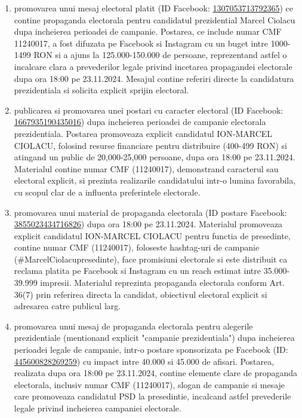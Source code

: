 \documentclass[a4paper,12pt]{article}
\begin{document}
\begin{enumerate}[leftmargin=*, label=\arabic*.)]
    \item promovarea unui mesaj electoral platit (ID Facebook: \href{https://www.facebook.com/ads/library/?id=1307053713792365}{1307053713792365}) ce contine propaganda electorala pentru candidatul prezidential Marcel Ciolacu dupa incheierea perioadei de campanie. Postarea, ce include numar CMF 11240017, a fost difuzata pe Facebook si Instagram cu un buget intre 1000-1499 RON si a ajuns la 125.000-150.000 de persoane, reprezentand astfel o incalcare clara a prevederilor legale privind incetarea propagandei electorale dupa ora 18:00 pe 23.11.2024. Mesajul contine referiri directe la candidatura prezidentiala si solicita explicit sprijin electoral.
    \item publicarea si promovarea unei postari cu caracter electoral (ID Facebook: \href{https://www.facebook.com/ads/library/?id=1667935190435016}{1667935190435016}) dupa incheierea perioadei de campanie electorala prezidentiala. Postarea promoveaza explicit candidatul ION-MARCEL CIOLACU, folosind resurse financiare pentru distribuire (400-499 RON) si atingand un public de 20,000-25,000 persoane, dupa ora 18:00 pe 23.11.2024. Materialul contine numar CMF (11240017), demonstrand caracterul sau electoral explicit, si prezinta realizarile candidatului intr-o lumina favorabila, cu scopul clar de a influenta preferintele electorale.
    \item promovarea unui material de propaganda electorala (ID postare Facebook: \href{https://www.facebook.com/ads/library/?id=3855023434716826}{3855023434716826}) dupa ora 18:00 pe 23.11.2024. Materialul promoveaza explicit candidatul ION-MARCEL CIOLACU pentru functia de presedinte, contine numar CMF (11240017), foloseste hashtag-uri de campanie (\#MarcelCiolacupresedinte), face promisiuni electorale si este distribuit ca reclama platita pe Facebook si Instagram cu un reach estimat intre 35.000-39.999 impresii. Materialul reprezinta propaganda electorala conform Art. 36(7) prin referirea directa la candidat, obiectivul electoral explicit si adresarea catre publicul larg.
    \item promovarea unui mesaj de propaganda electorala pentru alegerile prezidentiale (mentionand explicit "campanie prezidentiala") dupa incheierea perioadei legale de campanie, intr-o postare sponsorizata pe Facebook (ID: \href{https://www.facebook.com/ads/library/?id=445600828269259}{445600828269259}) cu impact intre 40.000 si 45.000 de afisari. Postarea, realizata dupa ora 18:00 pe 23.11.2024, contine elemente clare de propaganda electorala, inclusiv numar CMF (11240017), slogan de campanie si mesaje care promoveaza candidatul PSD la presedintie, incalcand astfel prevederile legale privind incheierea campaniei electorale.

\end{enumerate}
\end{document}
